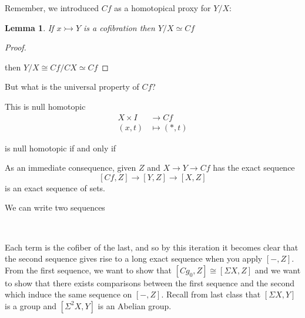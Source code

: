 \documentclass[10pt]{article}
\newtheorem{lemma}[theorem]{Lemma}
\theoremstyle{definition}
\begin{document}
	Remember, we introduced $Cf$ as a homotopical proxy for $Y/X$:
	
	\begin{lemma}{1}
		If $x\rightarrowtail Y$ is a cofibration then $Y/X\simeq Cf$
	\end{lemma}
	\begin{proof}
		\begin{center}
		\end{center}
		then $Y/X\cong Cf/CX\simeq Cf$
	\end{proof}
	
	But what is the universal property of $Cf$? \begin{center}
	\end{center}
	This is null homotopic \begin{equation*}
	\begin{split}
	X\times I &\to Cf\\
	(x,t)&\mapsto (\ast,t)
	\end{split}
	\end{equation*}
	
	\begin{center}
		is null homotopic if and only if \
	\end{center}
	As an immediate consequence, given $Z$ and $X\to Y \to Cf$ has the exact sequence \[
	[Cf,Z]\to [Y,Z]\to [X,Z]
	\]
	is an exact sequence of sets. 
	
	We can write two sequences
	\begin{center}
		\\
	\end{center}
	Each term is the cofiber of the last, and so by this iteration it becomes clear that the second sequence gives rise to a long exact sequence when you apply $[-,Z]$. From the first sequence, we want to show that $[Cg_0,Z]\cong [\Sigma X,Z]$ and we want to show that there exists comparisons between the first sequence and the second which induce the same sequence on $[-,Z]$. Recall from last class that $[\Sigma X,Y]$ is a group and $[\Sigma^2 X,Y]$ is an Abelian group. 
	
\end{document}

